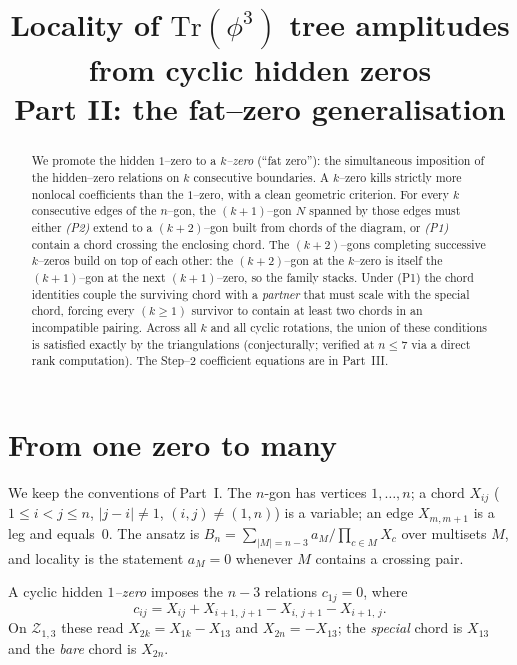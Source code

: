\documentclass[11pt]{article}
\title{\vspace{-1.2em}Locality of $\mathrm{Tr}(\phi^3)$ tree amplitudes from cyclic hidden zeros\\[2pt]
\large Part II: the fat--zero generalisation}
\date{}
\author{}
\theoremstyle{definition}
\newcommand{\Z}{\mathcal{Z}}
\newcommand{\X}[1]{X_{#1}}
\begin{document}
\maketitle
\vspace{-3.2em}

\begin{abstract}
\noindent We promote the hidden $1$--zero to a \emph{$k$--zero} (``fat zero''): the simultaneous
imposition of the hidden--zero relations on $k$ consecutive boundaries. A $k$--zero kills strictly
more nonlocal coefficients than the $1$--zero, with a clean geometric criterion. For every $k$
consecutive edges of the $n$--gon, the $(k{+}1)$--gon $N$ spanned by those edges must either
\emph{(P2)} extend to a $(k{+}2)$--gon built from chords of the diagram, or \emph{(P1)} contain a
chord crossing the enclosing chord. The $(k{+}2)$--gons completing successive $k$--zeros build on
top of each other: the $(k{+}2)$--gon at the $k$--zero is itself the $(k{+}1)$--gon at the next
$(k{+}1)$--zero, so the family stacks. Under (P1) the chord identities couple the surviving chord
with a \emph{partner} that must scale with the special chord, forcing every $(k\ge 1)$ survivor to
contain at least two chords in an incompatible pairing. Across all $k$ and all cyclic rotations, the
union of these conditions is satisfied exactly by the triangulations (conjecturally; verified at
$n\le 7$ via a direct rank computation). The Step--$2$ coefficient equations are in Part~III.
\end{abstract}

\section{From one zero to many}
We keep the conventions of Part~I. The $n$-gon has vertices $1,\dots,n$; a chord $\X{ij}$
($1\le i<j\le n$, $|j-i|\neq 1$, $(i,j)\neq(1,n)$) is a variable; an edge $\X{m,m+1}$ is a leg and
equals~$0$. The ansatz is $B_n=\sum_{|M|=n-3}a_M\big/\!\prod_{c\in M}\X{c}$ over multisets $M$, and
locality is the statement $a_M=0$ whenever $M$ contains a crossing pair.

A cyclic hidden \emph{$1$--zero} imposes the $n-3$ relations $c_{1j}=0$, where
\begin{equation}\label{eq:c}
  c_{ij}=\X{ij}+\X{i+1,\,j+1}-\X{i,\,j+1}-\X{i+1,\,j}.
\end{equation}
On $\Z_{1,3}$ these read $\X{2k}=\X{1k}-\X{13}$ and $\X{2n}=-\X{13}$; the \emph{special} chord is
$\X{13}$ and the \emph{bare} chord is $\X{2n}$.
\end{document}
